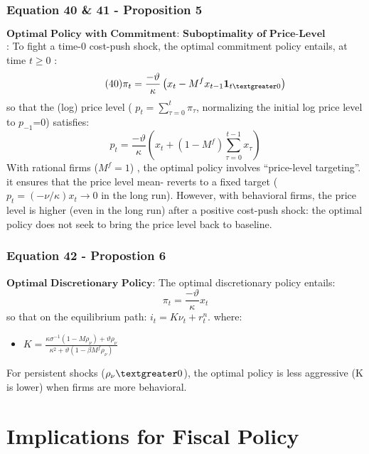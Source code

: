 \documentclass{article}
\begin{document}
\subsubsection*{Equation 40 \& 41 - Proposition 5}
$\textbf{Optimal Policy with Commitment: Suboptimality of Price-Level Targeting}$: To fight a time-0 cost-push shock, the optimal commitment policy entails, at time $t \geq 0$ :
\begin{equation}\tag{40}
    \pi_{t}=\frac{-\vartheta}{\kappa}\left(x_{t}-M^{f}x_{t-1}\textbf{1}_{t\textgreater 0}\right)
\end{equation}
so that the (log) price level ( $p_{t}=\sum\limits_{\tau=0}^{t}\pi_{\tau}$, normalizing the initial log price level to $p_{-1}$=0) satisfies:
\begin{equation}\tag{41}
    p_{t}=\frac{-\vartheta}{\kappa}\left(x_{t}+\left(1-M^{f}\right)\sum_{\tau=0}^{t-1}x_{\tau}\right)
\end{equation}
With rational firms ($M^{f}=1$) , the optimal policy involves “price-level targeting”.
it ensures that the price level mean-
reverts to a fixed target ($p_{t}=(-\nu/\kappa)x_{t}\to0$ in the long run). However, with behavioral firms, the price level is higher (even in the long run) after a positive cost-push shock: the optimal policy does not seek to bring the price level back to baseline.

\subsubsection*{Equation 42 - Propostion 6}
$\textbf{Optimal Discretionary Policy}$: The optimal discretionary policy entails:
\begin{equation}\tag{42}
    \pi_{t}=\frac{-\vartheta}{\kappa}x_{t}
\end{equation}
so that on the equilibrium path: $i_{t}=K\nu_{t}+r_{t}^{n}$. where:
\begin{itemize}
    \item $K=\frac{\kappa\sigma^{-1}\left(1-M\rho_{\nu}\right)+\vartheta\rho_{\nu}}{\kappa^{2}+\vartheta\left(1-\beta M^{f}\rho_{\nu}\right)}$
\end{itemize}
For persistent shocks ($\rho_{\nu} \textgreater 0$), the optimal policy is less aggressive (K is
lower) when firms are more behavioral.

\section{Implications for Fiscal Policy}
\end{document}
